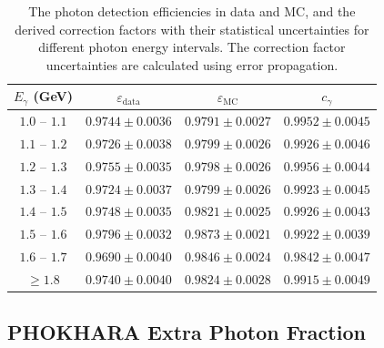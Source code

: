 \begin{table}[htbp]
    \begin{center}
        \caption{The photon detection efficiencies in data and MC, and the derived correction factors with their statistical uncertainties for different photon energy intervals. The correction factor uncertainties are calculated using error propagation.}
        \vspace{4mm}
        \renewcommand{\arraystretch}{1.3}
        \begin{tabular}{c | c | c | c}
            \hline \hline
            $E_{\gamma}$ (GeV) & $\varepsilon_{\text{data}}$ & $\varepsilon_{\text{MC}}$ & $c_{\gamma}$        \\
            \hline
            $1.0$ -- $1.1$     & $0.9744 \pm 0.0036$         & $0.9791 \pm 0.0027$       & $0.9952 \pm 0.0045$ \\
            \hline
            $1.1$ -- $1.2$     & $0.9726 \pm 0.0038$         & $0.9799 \pm 0.0026$       & $0.9926 \pm 0.0046$ \\
            \hline
            $1.2$ -- $1.3$     & $0.9755 \pm 0.0035$         & $0.9798 \pm 0.0026$       & $0.9956 \pm 0.0044$ \\
            \hline
            $1.3$ -- $1.4$     & $0.9724 \pm 0.0037$         & $0.9799 \pm 0.0026$       & $0.9923 \pm 0.0045$ \\
            \hline
            $1.4$ -- $1.5$     & $0.9748 \pm 0.0035$         & $0.9821 \pm 0.0025$       & $0.9926 \pm 0.0043$ \\
            \hline
            $1.5$ -- $1.6$     & $0.9796 \pm 0.0032$         & $0.9873 \pm 0.0021$       & $0.9922 \pm 0.0039$ \\
            \hline
            $1.6$ -- $1.7$     & $0.9690 \pm 0.0040$         & $0.9846 \pm 0.0024$       & $0.9842 \pm 0.0047$ \\
            \hline
            $\ge 1.8$          & $0.9740 \pm 0.0040$         & $0.9824 \pm 0.0028$       & $0.9915 \pm 0.0049$ \\
            \hline \hline
        \end{tabular}
        \label{tab:isr_correction}
    \end{center}
\end{table}

\subsection{PHOKHARA Extra Photon Fraction}

